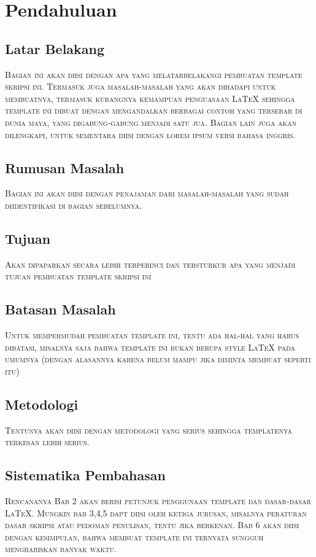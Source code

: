 \chapter{Pendahuluan}
\label{chap:intro}
   
\section{Latar Belakang}
\label{sec:label}
\textsc{
Bagian ini akan diisi dengan apa yang melatarbelakangi pembuatan template skripsi ini.
Termasuk juga masalah-masalah yang akan dihadapi untuk membuatnya, termasuk kurangnya kemampuan penguasaan \LaTeX{} sehingga template ini dibuat dengan mengandalkan berbagai contoh yang tersebar di dunia maya, yang digabung-gabung menjadi satu jua.
Bagian lain juga akan dilengkapi, untuk sementara diisi dengan lorem ipsum versi bahasa inggris.
}

\kant[5-10]

\section{Rumusan Masalah}
\label{sec:rumusan}
\textsc{
Bagian ini akan diisi dengan penajaman dari masalah-masalah yang sudah diidentifikasi di bagian sebelumnya. 
}

\kant[6]

\section{Tujuan}
\label{sec:tujuan}
\textsc{
Akan dipaparkan secara lebih terperinci dan tersturkur apa yang menjadi tujuan pembuatan template skripsi ini
}

\kant[7]

\section{Batasan Masalah}
\label{sec:batasan}
\textsc{
Untuk mempermudah pembuatan template ini, tentu ada hal-hal yang harus dibatasi, misalnya saja bahwa template ini bukan berupa style \LaTeX{} pada umumnya (dengan alasannya karena belum mampu jika diminta membuat seperti itu)
}

\kant[8]

\section{Metodologi}
\label{sec:metlit}
\textsc{
Tentunya akan diisi dengan metodologi yang serius sehingga templatenya terkesan lebih serius.
}

\kant[9]

\section{Sistematika Pembahasan}
\label{sec:sispem}
\textsc{
Rencananya Bab 2 akan berisi petunjuk penggunaan template dan dasar-dasar \LaTeX.
Mungkin bab 3,4,5 dapt diisi oleh ketiga jurusan, misalnya peraturan dasar skripsi atau pedoman penulisan, tentu jika berkenan.
Bab 6 akan diisi dengan kesimpulan, bahwa membuat template ini ternyata sungguh menghabiskan banyak waktu.
}

\kant[10]